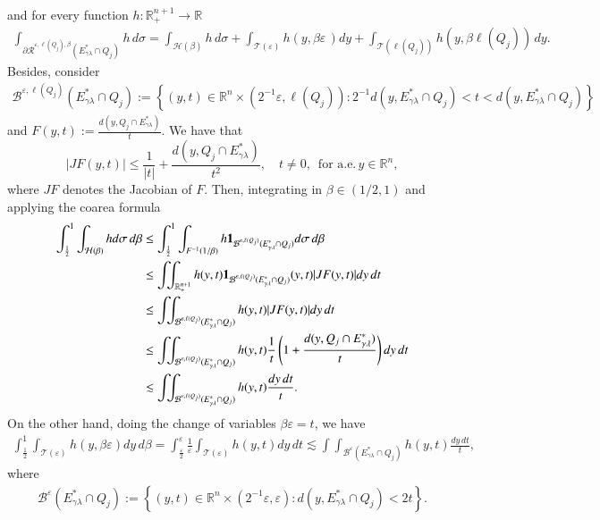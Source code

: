 \documentclass[11pt, a4paper,leqno]{amsart}
\renewcommand{\chi}{{\bf 1}}
\theoremstyle{plain}
\theoremstyle{definition}
\theoremstyle{remark}
\numberwithin{equation}{section}
\def \R{ \mathbb{R} }
\def \iint{\int\!\!\!\int}
\begin{document}
and for every function $h:\R^{n+1}_+\rightarrow \R$
\begin{align*}
\int_{\partial \mathcal{R}^{\varepsilon,\ell(Q_j),\beta}(E^*_{\gamma\lambda}\cap Q_j)}h\,d\sigma
=
\int_{\mathcal{H}(\beta)}h\,d\sigma
+
\int_{\mathcal{T}(\varepsilon)}h(y,\beta\varepsilon\,)dy
+
\int_{\mathcal{T}(\ell(Q_j))}h(y,\beta \ell(Q_j))\,dy.
\end{align*}
Besides, consider
\begin{align*}
\mathcal{B}^{\varepsilon,\ell(Q_j)}(E^*_{\gamma\lambda}\cap Q_j):=\left\{(y,t)\in \mathbb{R}^n\times (2^{-1}\varepsilon,\ell(Q_j)) : 2^{-1}d(y,E^*_{\gamma\lambda}\cap Q_j)<t<d(y,E^*_{\gamma\lambda}\cap Q_j)\right\}
\end{align*}
and
  $F(y,t):=\frac{d(y,Q_j\cap E^*_{\gamma\lambda})}{t}$. We have that
$$
|JF(y,t)|\leq\frac{1}{|t|}+\frac{d(y,Q_j\cap E^*_{\gamma\lambda})}{t^2}, \quad t\neq 0,\,\textrm{ for a.e.} \,y\in \R^n,
$$ 
where $JF$ denotes the Jacobian of $F$. 
Then, integrating in $\beta\in (1/2,1)$ and applying the coarea formula
\begin{align*}
\int_{\frac{1}{2}}^1
\int_{\mathcal{H}(\beta)}hd\sigma\,d\beta
&\leq 
\int_{\frac{1}{2}}^1
\int_{F^{-1}(1/\beta)}h\chi_{\mathcal{B}^{\varepsilon,\ell(Q_j)}(E^*_{\gamma\lambda}\cap Q_j)}d\sigma\,d\beta
\\&
\leq
\iint_{\R^{n+1}_+}h(y,t)\chi_{\mathcal{B}^{\varepsilon,\ell(Q_j)}(E^*_{\gamma\lambda}\cap Q_j)}(y,t)|JF(y,t)|dy\,dt
\\&
\leq\iint_{\mathcal{B}^{\varepsilon, \ell(Q_j)}(E^*_{\gamma\lambda}\cap Q_j)}h(y,t)|JF(y,t)|dy\,dt
\\&
\leq \iint_{\mathcal{B}^{\varepsilon, \ell(Q_j)}(E^*_{\gamma\lambda}\cap Q_j)}h(y,t)
\frac{1}{t}\left(1+\frac{d(y,Q_j\cap E^*_{\gamma\lambda})}{t}\right)dy\,dt
\\&
\lesssim \iint_{\mathcal{B}^{\varepsilon, \ell(Q_j)}(E^*_{\gamma\lambda}\cap Q_j)}h(y,t)
\frac{dy\,dt}{t}.
\end{align*}
On the other hand, doing the change of variables $\beta\varepsilon=t$, we have 
\begin{align*}
\int_{\frac{1}{2}}^1
\int_{\mathcal{T}(\varepsilon)}h(y,\beta\varepsilon)dy\,d\beta
=
\int_{\frac{\varepsilon}{2}}^{\varepsilon}\frac{1}{\varepsilon}
\int_{\mathcal{T}(\varepsilon)}h(y,t)dy\,dt
\lesssim
 \iint_{\mathcal{B}^{\varepsilon}(E^*_{\gamma\lambda}\cap Q_j)}h(y,t)\frac{dy\,dt}{t},
\end{align*}
where
\begin{align*}
\mathcal{B}^{\varepsilon}(E^*_{\gamma\lambda}\cap Q_j):=\left\{(y,t)\in \mathbb{R}^n\times (2^{-1}\varepsilon,\varepsilon) : d(y,E^*_{\gamma\lambda}\cap Q_j)<2t\right\}.
\end{align*}
\end{document}
